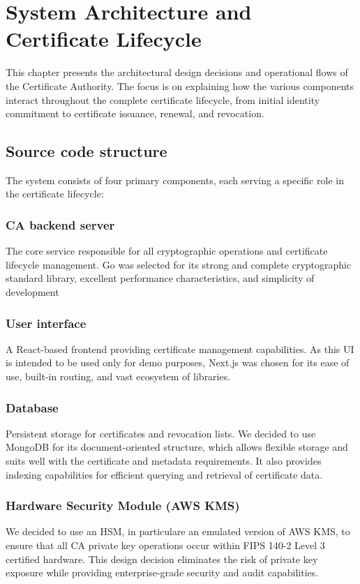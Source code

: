 \chapter{System Architecture and Certificate Lifecycle}
\label{Architecture}

This chapter presents the architectural design decisions and  operational flows 
of the Certificate Authority. The focus is on explaining how the various 
components interact throughout the complete certificate lifecycle, from initial 
identity commitment to certificate issuance, renewal, and revocation.


\section{Source code structure}

The system consists of four primary components, each serving a specific role in 
the certificate lifecycle:

\subsection{CA backend server} 
The core service responsible for all cryptographic operations and certificate 
lifecycle management. Go was selected for its strong and complete cryptographic standard library, 
excellent performance characteristics, and simplicity of development

\subsection{User interface}
A React-based frontend providing certificate management capabilities. As this UI is intended 
to be used only for demo purposes, Next.js was chosen for its ease of use, built-in routing, 
and vast ecosystem of libraries.

\subsection{Database}
Persistent storage for certificates and revocation lists. We decided to use MongoDB for its
document-oriented structure, which allows flexible storage and suits well with the certificate and 
metadata requirements. It also provides indexing capabilities for efficient 
querying and retrieval of certificate data.

\subsection{Hardware Security Module (AWS KMS)}
We decided to use an HSM, in particulare an emulated version of AWS KMS, to ensure that all CA 
private key operations occur within FIPS 140-2 Level 3 certified hardware. 
This design decision eliminates the risk of private key exposure while providing 
enterprise-grade security and audit capabilities.

